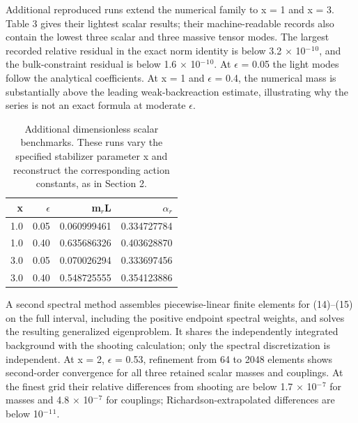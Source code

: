 \documentclass[11pt]{article}
\begin{document}
Additional reproduced runs extend the numerical family to x = 1 and x = 3. Table 3 gives their lightest scalar results; their machine-readable records also contain the lowest three scalar and three massive tensor modes. The largest recorded relative residual in the exact norm identity is below 3.2 \(\times\) 10\({}^-\)\({}^1\)\({}^0\), and the bulk-constraint residual is below 1.6 \(\times\) 10\({}^-\)\({}^1\)\({}^0\). At \(\epsilon\) = 0.05 the light modes follow the analytical coefficients. At x = 1 and \(\epsilon\) = 0.4, the numerical mass is substantially above the leading weak-backreaction estimate, illustrating why the series is not an exact formula at moderate \(\epsilon\).

\begin{table}[htbp]
\centering
\small
\begin{tabular}{rrrr}
\toprule
x & \(\epsilon\) & m\({}_r\)L & \(\alpha\)\({}_r\)\\
\midrule
1.0 & 0.05 & 0.060999461 & 0.334727784\\
1.0 & 0.40 & 0.635686326 & 0.403628870\\
3.0 & 0.05 & 0.070026294 & 0.333697456\\
3.0 & 0.40 & 0.548725555 & 0.354123886\\
\bottomrule
\end{tabular}
\caption{Additional dimensionless scalar benchmarks. These runs vary the specified stabilizer parameter x and reconstruct the corresponding action constants, as in Section 2.}
\end{table}
A second spectral method assembles piecewise-linear finite elements for (14)--(15) on the full interval, including the positive endpoint spectral weights, and solves the resulting generalized eigenproblem. It shares the independently integrated background with the shooting calculation; only the spectral discretization is independent. At x = 2, \(\epsilon\) = 0.53, refinement from 64 to 2048 elements shows second-order convergence for all three retained scalar masses and couplings. At the finest grid their relative differences from shooting are below 1.7 \(\times\) 10\({}^-\)\({}^7\) for masses and 4.8 \(\times\) 10\({}^-\)\({}^7\) for couplings; Richardson-extrapolated differences are below 10\({}^-\)\({}^1\)\({}^1\).
\end{document}
